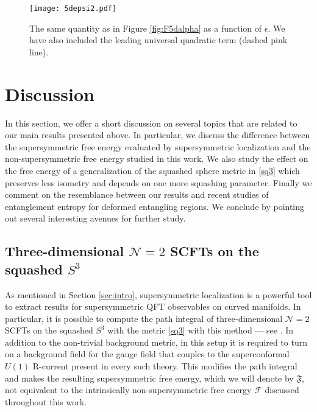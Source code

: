 \documentclass[12pt]{article}
\numberwithin{equation}{section}
\begin{document}
\begin{figure}[H]
	\centering
	\texttt{[image: 5depsi2.pdf]}
	\caption{The same quantity as in Figure \ref{fig:F5dalpha} as a function of $\epsilon$. We have also included the leading universal quadratic term (dashed pink line).}\label{fig:F5depsilon}
\end{figure}



\section{Discussion} 
\label{sec:disc}   

In this section, we offer a short discussion on several topics that are related to our main results presented above. In particular, we discuss the difference between the supersymmetric free energy evaluated by supersymmetric localization and the non-supersymmetric free energy studied in this work. We also study the effect on the free energy of a generalization of the squashed sphere metric in \eqref{sq3} which preserves less isometry and depends on one more squashing parameter. Finally we comment on the resemblance between our results and recent studies of entanglement entropy for deformed entangling regions. We conclude by pointing out several interesting avenues for further study.


\subsection{Three-dimensional $\mathcal{N}=2$ SCFTs on the squashed $S^3$}

As mentioned in Section \ref{sec:intro}, supersymmetric localization is a powerful tool to extract results for supersymmetric QFT observables on curved manifolds. In particular, it is possible to compute the path integral of three-dimensional $\mathcal{N}=2$ SCFTs on the squashed $S^3$ with the metric \eqref{sq3} with this method --- see \cite{Hama:2011ea,Imamura:2011wg}. In addition to the non-trivial background metric, in this setup it is required to turn on a background field for the gauge field that couples to the superconformal $U(1)$ R-current present in every such theory. This modifies the path integral and makes the resulting supersymmetric free energy, which we will denote by $\mathfrak{F}$, not equivalent to the intrinsically non-supersymmetric free energy $\mathcal{F}$ discussed throughout this work.
\end{document}
